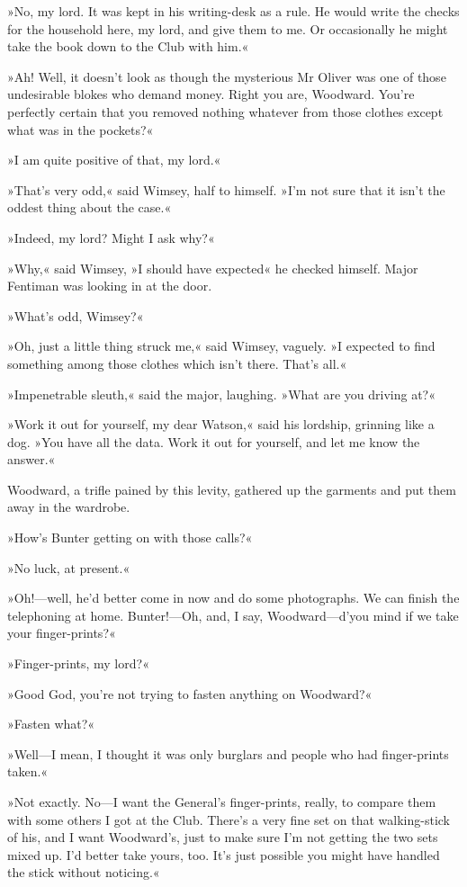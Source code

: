 »No, my lord. It was kept in his writing-desk as a rule. He would write the checks for the household here, my lord, and give them to me. Or occasionally he might take the book down to the Club with him.«

»Ah! Well, it doesn't look as though the mysterious Mr Oliver was one of those undesirable blokes who demand money. Right you are, Woodward. You're perfectly certain that you removed nothing whatever from those clothes except what was in the pockets?«

»I am quite positive of that, my lord.«

»That's very odd,« said Wimsey, half to himself. »I'm not sure that it isn't the oddest thing about the case.«

»Indeed, my lord? Might I ask why?«

»Why,« said Wimsey, »I should have expected\longdash« he checked himself. Major Fentiman was looking in at the door.

»What's odd, Wimsey?«

»Oh, just a little thing struck me,« said Wimsey, vaguely. »I expected to find something among those clothes which isn't there. That's all.«

»Impenetrable sleuth,« said the major, laughing. »What are you driving at?«

»Work it out for yourself, my dear Watson,« said his lordship, grinning like a dog. »You have all the data. Work it out for yourself, and let me know the answer.«

Woodward, a trifle pained by this levity, gathered up the garments and put them away in the wardrobe.

»How's Bunter getting on with those calls?«

»No luck, at present.«

»Oh!---well, he'd better come in now and do some photographs. We can finish the telephoning at home. Bunter!---Oh, and, I say, Woodward\allowbreak---\allowbreak d'you mind if we take your finger-prints?«

»Finger-prints, my lord?«

»Good God, you're not trying to fasten anything on Woodward?«

»Fasten what?«

»Well\allowbreak---\allowbreak I mean, I thought it was only burglars and people who had finger-prints taken.«

»Not exactly. No\allowbreak---\allowbreak I want the General's finger-prints, really, to compare them with some others I got at the Club. There's a very fine set on that walking-stick of his, and I want Woodward's, just to make sure I'm not getting the two sets mixed up. I'd better take yours, too. It's just possible you might have handled the stick without noticing.«

